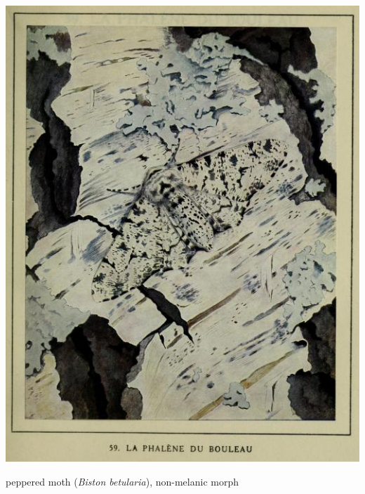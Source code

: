 \begin{marginfigure}[5cm]
\begin{center}\includegraphics[width= \textwidth]{illustration_images/hitchhiking/Pepper_moth/lespapillonsdans01robe_0375_trimmed.png}
\end{center}
\caption{peppered moth ({\it Biston betularia}), non-melanic morph  } \label{Peppered_moth}
\end{marginfigure}
